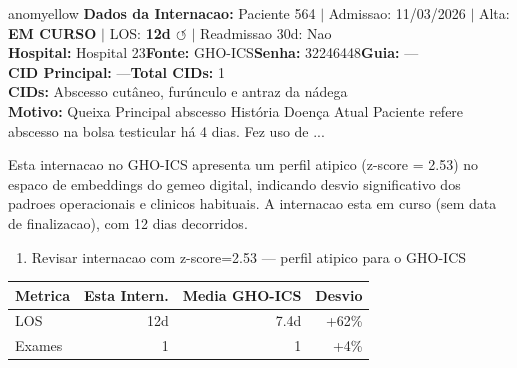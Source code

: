\documentclass[a4paper,10pt]{article}
\begin{document}
\begin{anomalycard}[Internacao 490 | GHO-ICS | MODERADO (z=2.53)]{anomyellow}
\textbf{Dados da Internacao:} Paciente 564 $\mid$ Admissao: 11/03/2026 $\mid$ Alta: \textcolor{anomorange}{\textbf{EM CURSO}} $\mid$ LOS: \textbf{12d \textcolor{anomorange}{$\circlearrowleft$}} $\mid$ Readmissao 30d: Nao\\
\textbf{Hospital:} Hospital 23\quad\textbf{Fonte:} GHO-ICS\quad\textbf{Senha:} 32246448\quad\textbf{Guia:} ---\\
\textbf{CID Principal:} {\small ---}\quad\textbf{Total CIDs:} 1\\

\textbf{CIDs:} {\scriptsize Abscesso cutâneo, furúnculo e antraz da nádega}\\

\textbf{Motivo:} {\scriptsize Queixa Principal    abscesso    História Doença Atual    Paciente refere abscesso na bolsa testicular há 4 dias. Fez uso de ...}\\

\vspace{2pt}\begin{tcolorbox}[colback=severityred!20,colframe=anomyellow,title={\textbf{Interpretacao de Negocio}},fonttitle=\bfseries\small,left=4pt,right=4pt,top=3pt,bottom=3pt]
{\small Esta internacao no GHO-ICS apresenta um perfil atipico (z-score = 2.53) no espaco de embeddings do gemeo digital, indicando desvio significativo dos padroes operacionais e clinicos habituais. A internacao esta em curso (sem data de finalizacao), com 12 dias decorridos.}
\end{tcolorbox}
\begin{tcolorbox}[colback=severityyellow!30,colframe=anomorange,title={\textbf{Recomendacoes Especificas}},fonttitle=\bfseries\small,left=4pt,right=4pt,top=3pt,bottom=3pt]
\begin{enumerate}[nosep,leftmargin=16pt]
\item {\small Revisar internacao com z-score=2.53 --- perfil atipico para o GHO-ICS}
\end{enumerate}
\end{tcolorbox}
\begin{center}\begin{tabular}{l r r r}\toprule\textbf{Metrica} & \textbf{Esta Intern.} & \textbf{Media GHO-ICS} & \textbf{Desvio} \\\midrule
LOS & 12d & 7.4d & \textcolor{anomorange}{+62\%} \\
Exames & 1 & 1 & +4\% \\
\bottomrule\end{tabular}\end{center}


\end{anomalycard}
\end{document}
